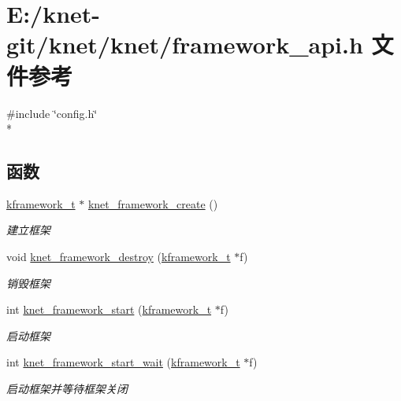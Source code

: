 \hypertarget{a00056}{}\section{E\+:/knet-\/git/knet/knet/framework\+\_\+api.h 文件参考}
\label{a00056}
{\ttfamily \#include \char`\"{}config.\+h\char`\"{}}\\*
\subsection*{函数}
\begin{DoxyCompactItemize}
\item 
\hyperlink{a00053_a3195a3be35782fc1efb920c811be111d_a3195a3be35782fc1efb920c811be111d}{kframework\+\_\+t} $\ast$ \hyperlink{a00106_ga066683c6d9defb4121552b439d11d7ba_ga066683c6d9defb4121552b439d11d7ba}{knet\+\_\+framework\+\_\+create} ()
\begin{DoxyCompactList}\small\item\em 建立框架 \end{DoxyCompactList}\item 
void \hyperlink{a00106_gaee7016dea12793dae5e6732fb86ee8d0_gaee7016dea12793dae5e6732fb86ee8d0}{knet\+\_\+framework\+\_\+destroy} (\hyperlink{a00053_a3195a3be35782fc1efb920c811be111d_a3195a3be35782fc1efb920c811be111d}{kframework\+\_\+t} $\ast$f)
\begin{DoxyCompactList}\small\item\em 销毁框架 \end{DoxyCompactList}\item 
int \hyperlink{a00106_gae2bea4af82f4cdce2f4efbf68aa8054c_gae2bea4af82f4cdce2f4efbf68aa8054c}{knet\+\_\+framework\+\_\+start} (\hyperlink{a00053_a3195a3be35782fc1efb920c811be111d_a3195a3be35782fc1efb920c811be111d}{kframework\+\_\+t} $\ast$f)
\begin{DoxyCompactList}\small\item\em 启动框架 \end{DoxyCompactList}\item 
int \hyperlink{a00106_ga5eda19f3b32bb48578cf735e877aac2e_ga5eda19f3b32bb48578cf735e877aac2e}{knet\+\_\+framework\+\_\+start\+\_\+wait} (\hyperlink{a00053_a3195a3be35782fc1efb920c811be111d_a3195a3be35782fc1efb920c811be111d}{kframework\+\_\+t} $\ast$f)
\begin{DoxyCompactList}\small\item\em 启动框架并等待框架关闭 \end{DoxyCompactList}\item 

\end{DoxyCompactItemize}

